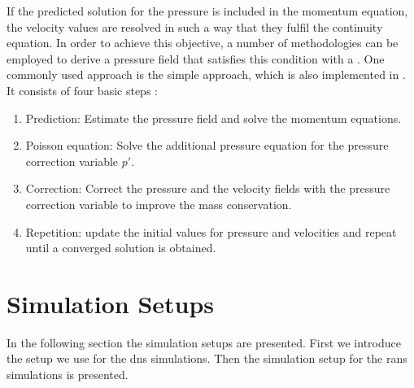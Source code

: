 If the predicted solution for the pressure is included in the momentum equation, the velocity values are resolved in such a way that they fulfil the continuity equation.
In order to achieve this objective, a  number of  methodologies can be employed
 to derive a pressure field that satisfies this condition with a  \citep{schlatter_lecture_2025, weller_tensorial_1998}.
One  commonly used  approach is the \acrfull{simple} approach, which is also implemented in .
It consists of four basic steps \citep{schlatter_lecture_2025}:
\begin{enumerate}
    \item Prediction: Estimate the pressure field and solve the momentum equations.
    \item Poisson equation: Solve the additional pressure equation for the  pressure correction variable $p'$.
    \item Correction: Correct the pressure and the velocity fields with the pressure correction variable to improve the mass conservation.
    \item Repetition: update the initial values for  pressure and velocities and repeat until a converged solution is obtained.
\end{enumerate}








 



\section{Simulation Setups}\label{sec:MethodCurvedTBL}

In the following section the simulation setups are presented.
First we introduce the setup we use for the \acrshort{dns} simulations.
Then the simulation setup for the \acrshort{rans} simulations is presented.

